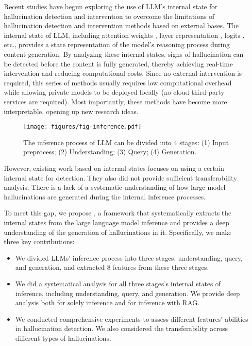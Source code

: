 Recent studies have begun exploring the use of LLM's internal state for hallucination detection and intervention to overcome the limitations of hallucination detection and intervention methods based on external bases.
The internal state of LLM, including attention weights \cite{beigi2024internalinspector, chuang2024lookback, yuksekgonul2023attention}, layer representation \cite{beigi2024internalinspector, ji2024llm, chen2024context, chen2024inside, su2024unsupervised, duan2024llms, azaria2023internal, he2024llm}, logits \cite{quevedo2024detecting, he2024llm}, etc., provides a state representation of the model's reasoning process during content generation.
By analyzing these internal states, signs of hallucination can be detected before the content is fully generated, thereby achieving real-time intervention and reducing computational costs.
Since no external intervention is required, this series of methods usually requires low computational overhead while allowing private models to be deployed locally (no cloud third-party services are required).
Most importantly, these methods have become more interpretable, opening up new research ideas.

\begin{figure}[htbp]
    \centering
    \texttt{[image: figures/fig-inference.pdf]}
    \caption{The inference process of LLM can be divided into 4 stages: (1) Input preprocess; (2) Understanding; (3) Query; (4) Generation.}
    \label{fig:infer}
\end{figure}

However, existing work based on internal states focuses on using a certain internal state for detection.
They also did not provide sufficient transferability analysis.
There is a lack of a systematic understanding of how large model hallucinations are generated during the internal inference processes.

To meet this gap, we propose \sysname, a framework that systematically extracts the internal states from the large language model inference and provides a deep understanding of the generation of hallucinations in it.
Specifically, we make three key contributions:
\begin{itemize}[itemsep=0pt, leftmargin=*,topsep=0pt]
    \item We divided LLMs' inference process into three stages: understanding, query, and generation, and extracted 8 features from these three stages.
    \item We did a systematical analysis for all three stages's internal states of inference, including understanding, query, and generation. We provide deep analysis both for solely inference and for inference with RAG.
    \item We conducted comprehensive experiments to assess different features' abilities in hallucination detection. We also considered the transferability across different types of hallucinations.
\end{itemize}


